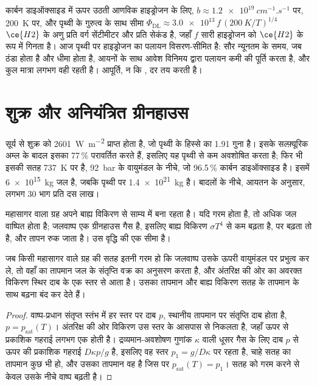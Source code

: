 कार्बन डाइऑक्साइड में ऊपर उठती आणविक हाइड्रोजन के लिए, $b \approx
\qty{1.2e19}{cm^{-1}.s^{-1}}$ पर, \qty{200}{K} पर, और पृथ्वी के गुरुत्व के साथ
सीमा $\Phi_\mathrm{DL} \approx
\num{3.0e13}\,f\,(\qty{200}{K}/T)^{1/4}$ $\ce{H2}$ के अणु प्रति वर्ग
सेंटीमीटर और प्रति सेकंड है, जहाँ $f$ सारी हाइड्रोजन को $\ce{H2}$ के रूप में गिनता है। आज
पृथ्वी पर हाइड्रोजन का पलायन विसरण-सीमित है: सौर न्यूनतम के समय, जब
 ठंडा होता है और  धीमा होता है, आयनों के साथ आवेश विनिमय द्वारा पलायन
कमी की पूर्ति करता है, और कुल मात्रा लगभग
वही रहती है। आपूर्ति, न कि
, दर तय करती है।

\section{शुक्र और अनियंत्रित ग्रीनहाउस}\label{sec:b3:planetary-atmospheres:venus}

सूर्य से शुक्र को \qty{2601}{W.m^{-2}} प्राप्त होता है, जो पृथ्वी के
हिस्से का 1.91 गुना है। इसके सल्फ़्यूरिक अम्ल के बादल इसका 77\,\% परावर्तित करते हैं, इसलिए
यह पृथ्वी से कम अवशोषित करता है; फिर भी इसकी सतह \qty{737}{K} पर है, \qty{92}{bar} के
वायुमंडल के नीचे, जो 96.5\,\% कार्बन डाइऑक्साइड है। इसमें \qty{6e15}{kg} जल है,
जबकि पृथ्वी पर \qty{1.4e21}{kg} है। बादलों के नीचे, आयतन के अनुसार,
लगभग 30 भाग प्रति दस लाख।

महासागर वाला ग्रह अपने बाह्य विकिरण से साम्य में बना रहता है। यदि
गरम होता है, तो अधिक जल वाष्पित होता है; जलवाष्प एक ग्रीनहाउस गैस है, इसलिए
बाह्य विकिरण $\sigma T^4$ से कम बढ़ता है, पर बढ़ता तो है, और
तापन रुक जाता है। उस वृद्धि की एक सीमा है।

\begin{proposition}[आर्द्र वायुमंडल की विकिरण सीमा]\label{prop:b3:planetary-atmospheres:limit}
जब किसी महासागर वाले ग्रह की सतह इतनी गरम हो कि जलवाष्प
उसके ऊपरी वायुमंडल पर प्रभुत्व कर ले, तो वहाँ का तापमान
जल के संतृप्ति वक्र का अनुसरण करता है, और अंतरिक्ष की ओर का अवरक्त विकिरण
स्थिर दाब के एक स्तर से आता है। उसका तापमान और बाह्य विकिरण
सतह के तापमान के साथ बढ़ना बंद कर देते हैं।
\end{proposition}

\begin{proof}
वाष्प-प्रधान संतृप्त स्तंभ में हर स्तर पर दाब $p$,
स्थानीय तापमान पर संतृप्ति दाब होता है, $p =
p_\mathrm{sat}(T)$। अंतरिक्ष की ओर विकिरण उस स्तर के आसपास से निकलता है,
जहाँ ऊपर से प्रकाशिक गहराई लगभग एक होती है। द्रव्यमान-अवशोषण गुणांक $\kappa$ वाली धूसर गैस के लिए
दाब $p$ से ऊपर की प्रकाशिक गहराई
$D\kappa p/g$ है, इसलिए वह स्तर $p_1 = g/D\kappa$ पर रहता है, चाहे
सतह का तापमान कुछ भी हो, और उसका तापमान वह है जिस पर
$p_\mathrm{sat}(T) = p_1$। सतह को गरम करने से केवल उसके नीचे वाष्प बढ़ती है।
\end{proof}

